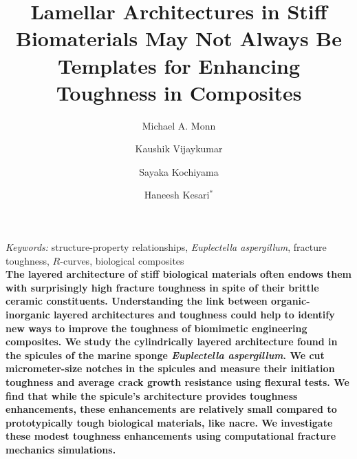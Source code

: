 \documentclass[12pt,onecolumn]{article}
\title{Lamellar Architectures in Stiff Biomaterials May Not Always Be Templates for Enhancing Toughness in Composites}
\author[1]{Michael A. Monn}
\author[1]{Kaushik Vijaykumar}
\author[1]{Sayaka Kochiyama}
\author[1]{Haneesh Kesari$^*$}
\affil[1]{Brown University School of Engineering, 184 Hope St, Providence, RI 02912, USA}
\date{}
\begin{document}
\maketitle
\emph{Keywords:}
structure-property relationships, 
\textit{Euplectella aspergillum}, 
fracture toughness, 
$R$-curves, 
biological composites
\\

{
\singlespacing\small \bf
The layered architecture of stiff biological materials often endows them with surprisingly high fracture toughness in spite of their brittle ceramic constituents. Understanding the link between organic-inorganic layered architectures and toughness could help to identify new ways to improve the toughness of biomimetic engineering composites. We study the cylindrically layered architecture found in the spicules of the marine sponge \textit{Euplectella aspergillum}. We cut micrometer-size notches in the spicules and measure their initiation toughness and average crack growth resistance using flexural tests. We find that while the spicule's architecture provides toughness enhancements, these enhancements are relatively small compared to prototypically tough biological materials, like nacre. We investigate these modest toughness enhancements using computational fracture mechanics simulations.
}
\end{document}
